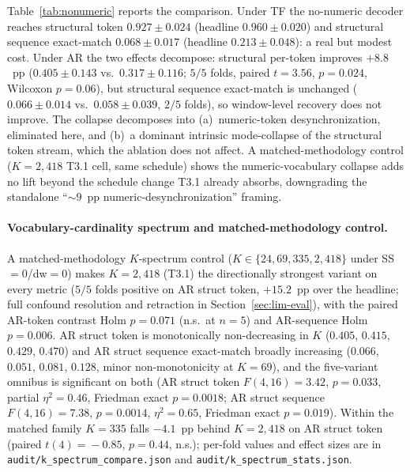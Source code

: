 \documentclass[sensors,article,submit,moreauthors,pdftex]{Definitions/mdpi}
\begin{document}
Table~\ref{tab:nonumeric} reports the comparison. Under TF the no-numeric decoder reaches structural token $0.927 \pm 0.024$ (headline $0.960 \pm 0.020$) and structural sequence exact-match $0.068 \pm 0.017$ (headline $0.213 \pm 0.048$): a real but modest cost. Under AR the two effects decompose: structural per-token improves $+8.8$~pp ($0.405 \pm 0.143$ vs.\ $0.317 \pm 0.116$; $5/5$ folds, paired $t=3.56$, $p=0.024$, Wilcoxon $p=0.06$), but structural sequence exact-match is unchanged ($0.066 \pm 0.014$ vs.\ $0.058 \pm 0.039$, $2/5$ folds), so window-level recovery does not improve. The collapse decomposes into (a)~numeric-token desynchronization, eliminated here, and (b)~a dominant intrinsic mode-collapse of the structural token stream, which the ablation does not affect. A matched-methodology control ($K\!=\!2{,}418$ T3.1 cell, same schedule) shows the numeric-vocabulary collapse adds no lift beyond the schedule change T3.1 already absorbs, downgrading the standalone ``$\sim\!9$~pp numeric-desynchronization'' framing.



\paragraph{Vocabulary-cardinality spectrum and matched-methodology control.}
A matched-methodology $K$-spectrum control ($K\!\in\!\{24, 69, 335, 2{,}418\}$ under SS$=$0/dw$=$0) makes $K\!=\!2{,}418$ (T3.1) the directionally strongest variant on every metric ($5/5$ folds positive on AR struct token, $+15.2$~pp over the headline; full confound resolution and retraction in Section~\ref{sec:lim-eval}), with the paired AR-token contrast Holm $p\!=\!0.071$ (n.s.\ at $n\!=\!5$) and AR-sequence Holm $p\!=\!0.006$. AR struct token is monotonically non-decreasing in $K$ ($0.405$, $0.415$, $0.429$, $0.470$) and AR struct sequence exact-match broadly increasing ($0.066$, $0.051$, $0.081$, $0.128$, minor non-monotonicity at $K\!=\!69$), and the five-variant omnibus is significant on both (AR struct token $F(4,16)\!=\!3.42$, $p\!=\!0.033$, partial $\eta^{2}\!=\!0.46$, Friedman exact $p\!=\!0.0018$; AR struct sequence $F(4,16)\!=\!7.38$, $p\!=\!0.0014$, $\eta^{2}\!=\!0.65$, Friedman exact $p\!=\!0.019$). Within the matched family $K\!=\!335$ falls $-4.1$~pp behind $K\!=\!2{,}418$ on AR struct token (paired $t(4)\!=\!-0.85$, $p\!=\!0.44$, n.s.); per-fold values and effect sizes are in \texttt{audit/k\_spectrum\_compare.json} and \texttt{audit/k\_spectrum\_stats.json}.
\end{document}
